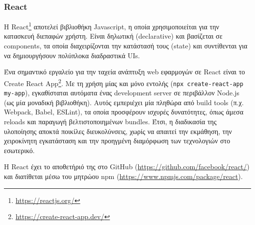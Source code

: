 \subsubsection{React} \label{subsection:4-3-2-1-react}


Η React\footnote{\url{https://reactjs.org/}} αποτελεί βιβλιοθήκη Javascript, η οποία χρησιμοποιείται για την κατασκευή διεπαφών χρήστη. Είναι δηλωτική (declarative) και βασίζεται σε components, τα οποία διαχειρίζονται την κατάστασή τους (state) και συντίθενται για να δημιουργήσουν πολύπλοκα διαδραστικά UIs.


Ένα σημαντικό εργαλείο για την ταχεία ανάπτυξη web εφαρμογών σε React είναι το Create React App\footnote{\url{https://create-react-app.dev/}}. Με τη χρήση μίας και μόνο εντολής (\texttt{npx create-react-app my-app}), εγκαθίσταται αυτόματα ένας development server σε περιβάλλον Node.js (ως μία μοναδική βιβλιοθήκη). Αυτός εμπεριέχει μία πληθώρα από build tools (π.χ. Webpack, Babel, ESLint), τα οποία προσφέρουν ισχυρές δυνατότητες, όπως άμεσα reloads και παραγωγή βελτιστοποιημένων bundles. Έτσι, η διαδικασία της υλοποίησης αποκτά ποικίλες διευκολύνσεις, χωρίς να απαιτεί την εκμάθηση, την χειροκίνητη εγκατάσταση και την προηγμένη διαμόρφωση των τεχνολογιών στο εσωτερικό. 

Η React έχει το αποθετήριό της στο GitHub (\url{https://github.com/facebook/react/}) και διατίθεται μέσω του μητρώου npm (\url{https://www.npmjs.com/package/react}).
